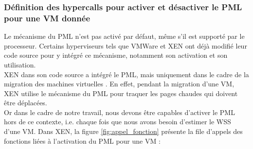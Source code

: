 \subsubsection{Définition des hypercalls pour activer et désactiver le PML pour une VM donnée}
Le mécanisme du PML n'est pas activé par défaut, même s'il est supporté par le processeur. Certains hyperviseurs tels que VMWare et XEN ont déjà modifié leur code source pour y intégré ce mécanisme, notamment son activation et son utilisation.\\  XEN dans son code source a intégré le PML, mais uniquement dans le cadre de la migration des machines virtuelles \cite{xen_pml}. En effet, pendant la migration d'une VM, XEN utilise le mécanisme du PML pour traquer les pages chaudes qui doivent être déplacées.\\
Or dans le cadre de notre travail, nous devons être capables d'activer le PML hors de ce contexte, i.e. chaque fois que nous avons besoin d'estimer le WSS d'une VM. Dans XEN, la figure \ref{fig:appel_fonction} présente la file d'appels des fonctions liées à l'activation du PML pour une VM : 
